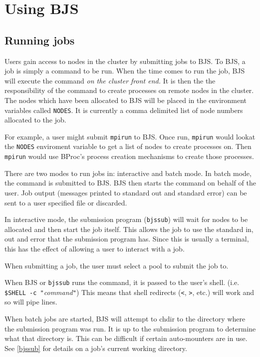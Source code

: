 \documentclass[oneside]{book}
\begin{document}
\chapter{Using BJS}  %

\section{Running jobs}

Users gain access to nodes in the cluster by submitting jobs to BJS.
To BJS, a job is simply a command to be run.  When the time comes to
run the job, BJS will execute the command \emph{on the cluster front
end.}  It is then the the responsibility of the command to create
processes on remote nodes in the cluster.  The nodes which have been
allocated to BJS will be placed in the environment variables called
\texttt{NODES}.  It is currently a comma delimited list of node
numbers allocated to the job.

For example, a user might submit \texttt{mpirun} to BJS.  Once run,
\texttt{mpirun} would lookat the \texttt{NODES} enviroment variable to
get a list of nodes to create processes on.  Then \texttt{mpirun}
would use BProc's process creation mechanisms to create those
processes.

There are two modes to run jobs in: interactive and batch mode.  In
batch mode, the command is submitted to BJS.  BJS then starts the
command on behalf of the user.  Job output (messages printed to
standard out and standard error) can be sent to a user specified file
or discarded.

In interactive mode, the submission program (\texttt{bjssub}) will
wait for nodes to be allocated and then start the job itself.  This
allows the job to use the standard in, out and error that the
submission program has.  Since this is usually a terminal, this has
the effect of allowing a user to interact with a job.

When submitting a job, the user must select a pool to submit the job
to.



When BJS or \texttt{bjssub} runs the command, it is passed to the
user's shell.  (i.e. \texttt{\$SHELL -c "}\emph{command}\texttt{"})
This means that shell redirects (\texttt{<}, \texttt{>}, etc.) will
work and so will pipe lines.

When batch jobs are started, BJS will attempt to chdir to the
directory where the submission program was run.  It is up to the
submission program to determine what that directory is.  This can be
difficult if certain auto-mounters are in use.  See \ref{bjssub} for
details on a job's current working directory.
\end{document}
